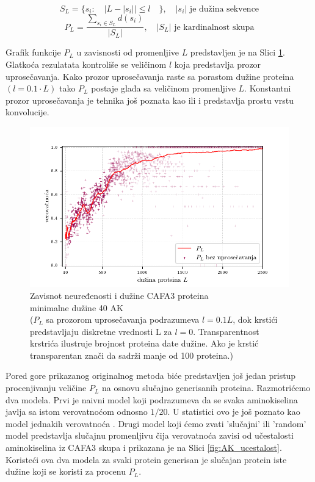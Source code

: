 $$ S_L = \{s_i : \quad | L -  | s_i | | \le l \quad \}, \quad   |s_i| \text{ je dužina sekvence}  $$
$$ P_L = \dfrac{ \sum_{s_i \in S_L} d(s_i)} {| S_L |}, \quad   |S_L| \text{ je kardinalnost skupa}$$

Grafik funkcije $P_L$ u zavisnosti od promenljive $L$ predstavljen je na Slici
\ref{fig:PL1}.  Glatkoća rezulatata kontroliše se veličinom $l$ koja
predstavlja prozor uprosečavanja. Kako prozor uprosečavanja raste sa porastom
dužine proteina $(l = 0.1 \cdot L)$ tako $P_L$ postaje glađa sa veličinom
promenljive $L$.  Konstantni prozor uprosečavanja je tehnika još poznata
kao  ili  i predstavlja prostu vrstu
konvolucije. 


\begin{figure}[th]
\centering
\includegraphics[]{plots/PL_F}
\caption {
  Zavisnot neuređenosti i dužine CAFA3 proteina \\ minimalne dužine 40 AK
  \\ \footnotesize
  ($P_L$ sa prozorom uprosečavanja podrazumeva $l = 0.1L$, dok
  krstići predstavljaju diskretne vrednosti L za $l = 0$. Transparentnost krstrića
  ilustruje brojnost proteina date dužine. Ako je krstić transparentan
  znači da sadrži manje od 100 proteina.)
}
\label{fig:PL1}
\end{figure}


Pored gore prikazanog originalnog metoda biće predstavljen još jedan pristup
procenjivanju veličine $P_L$ na osnovu slučajno generisanih proteina.
Razmotrićemo dva modela. Prvi je naivni model 
koji podrazumeva da se svaka aminokiselina javlja sa istom verovatnoćom odnosno
$1/20$. U statistici ovo je još poznato kao model jednakih verovatnoća .  Drugi
model koji ćemo zvati 'slučajni' ili 'random' model predstavlja slučajnu
promenljivu čija verovatnoća zavisi od učestalosti aminokiselina iz CAFA3 skupa
i prikazana je na Slici \ref{fig:AK_ucestalost}.  Koristeći ova dva modela za
svaki protein generisan je slučajan protein iste dužine koji se koristi za
procenu $P_L$.


